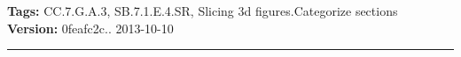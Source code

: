 \documentclass[twocolumn,10pt]{article}
\begin{document}
\medskip
\noindent
\textbf{Tags:} {\footnotesize CC.7.G.A.3, SB.7.1.E.4.SR, Slicing 3d figures.Categorize sections}\\
\textbf{Version:} 0feafc2c.. 2013-10-10
\smallskip\hrule



\end{document}
